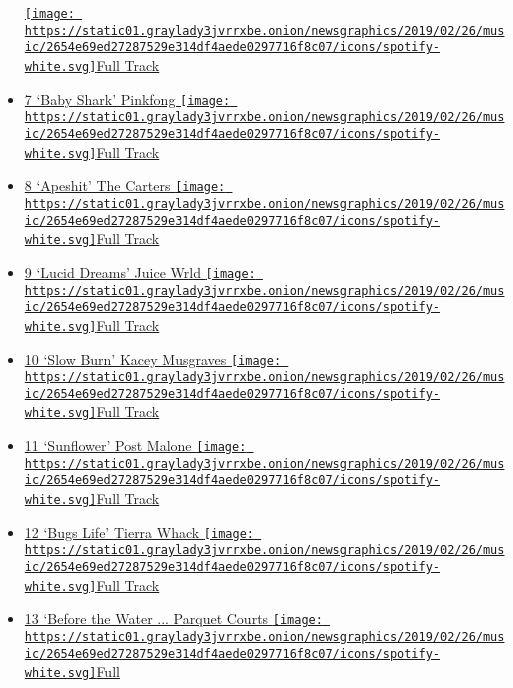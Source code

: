 \begin{itemize}
  \href{https://open.spotify.com/track/1sv0BhPPnrUgQ6dziZlmuM}{\texttt{[image: https://static01.graylady3jvrrxbe.onion/newsgraphics/2019/02/26/music/2654e69ed27287529e314df4aede0297716f8c07/icons/spotify-white.svg]}Full
  Track}
\item
  \protect\hyperlink{ux2fpinkfong}{7 `Baby Shark' Pinkfong }
  \href{https://open.spotify.com/track/5ygDXis42ncn6kYG14lEVG}{\texttt{[image: https://static01.graylady3jvrrxbe.onion/newsgraphics/2019/02/26/music/2654e69ed27287529e314df4aede0297716f8c07/icons/spotify-white.svg]}Full
  Track}
\item
  \protect\hyperlink{ux2fthe-carters}{8 `Apeshit' The Carters }
  \href{https://open.spotify.com/track/0E6PsO3ymCfUh7pJQjBgkj}{\texttt{[image: https://static01.graylady3jvrrxbe.onion/newsgraphics/2019/02/26/music/2654e69ed27287529e314df4aede0297716f8c07/icons/spotify-white.svg]}Full
  Track}
\item
  \protect\hyperlink{ux2fjuice-wrld}{9 `Lucid Dreams' Juice Wrld }
  \href{https://open.spotify.com/track/285pBltuF7vW8TeWk8hdRR}{\texttt{[image: https://static01.graylady3jvrrxbe.onion/newsgraphics/2019/02/26/music/2654e69ed27287529e314df4aede0297716f8c07/icons/spotify-white.svg]}Full
  Track}
\item
  \protect\hyperlink{ux2fkacey-musgraves}{10 `Slow Burn' Kacey Musgraves
  }
  \href{https://open.spotify.com/track/6ET9kf9riLETWs9lePUEAI}{\texttt{[image: https://static01.graylady3jvrrxbe.onion/newsgraphics/2019/02/26/music/2654e69ed27287529e314df4aede0297716f8c07/icons/spotify-white.svg]}Full
  Track}
\item
  \protect\hyperlink{ux2fpost-malone}{11 `Sunflower' Post Malone }
  \href{https://open.spotify.com/track/3KkXRkHbMCARz0aVfEt68P}{\texttt{[image: https://static01.graylady3jvrrxbe.onion/newsgraphics/2019/02/26/music/2654e69ed27287529e314df4aede0297716f8c07/icons/spotify-white.svg]}Full
  Track}
\item
  \protect\hyperlink{ux2ftierra-whack}{12 `Bugs Life' Tierra Whack }
  \href{https://open.spotify.com/track/4lLdrM9fpLA1Pcng9WNMLp}{\texttt{[image: https://static01.graylady3jvrrxbe.onion/newsgraphics/2019/02/26/music/2654e69ed27287529e314df4aede0297716f8c07/icons/spotify-white.svg]}Full
  Track}
\item
  \protect\hyperlink{ux2fparquet-courts}{13 `Before the Water ...
  Parquet Courts }
  \href{https://open.spotify.com/track/5wpBEy8gYVQmb5VArtayfp}{\texttt{[image: https://static01.graylady3jvrrxbe.onion/newsgraphics/2019/02/26/music/2654e69ed27287529e314df4aede0297716f8c07/icons/spotify-white.svg]}Full
}
\end{itemize}
